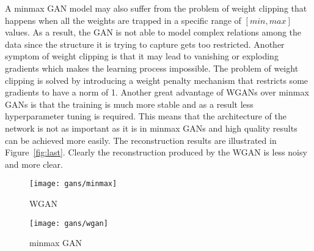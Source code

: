 \documentclass[conference,compsoc]{IEEEtran}
\begin{document}
 A minmax GAN model may also suffer from the problem of weight clipping that happens when all the weights are trapped in a specific range of $[min,max]$ values. As a result, the GAN is not able to model complex relations among the data since the structure it is trying to capture gets too restricted. Another symptom of weight clipping is that it may lead to vanishing or exploding gradients which makes the learning process impossible. The problem of weight clipping is solved by introducing a weight penalty mechanism that restricts some gradients to have a norm of 1. Another great advantage of WGANs over minmax GANs is that the training is much more stable and as a result less hyperparameter tuning is required. This means that the architecture of the network is not as important as it is in minmax GANs and high quality results can be achieved more easily. The reconstruction results are illustrated in Figure~\ref{fig:last}. Clearly the reconstruction produced by the WGAN is less noisy and more clear.






        \begin{figure*}[]
        \centering
    
         \begin{subfigure}{0.40\linewidth}
            \texttt{[image: gans/minmax]}
            \caption{WGAN}
        \end{subfigure}  
        \begin{subfigure}{0.40\linewidth}
            \texttt{[image: gans/wgan]}
            \caption{minmax GAN}
        \end{subfigure}
		        
        \caption{Comparing the performance of WGAN and minmax GAN}
        \label{fig:last}
\end{figure*}
\end{document}
